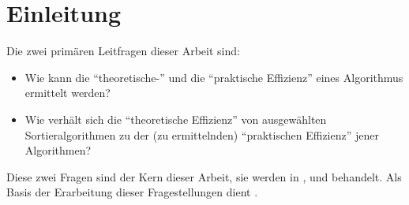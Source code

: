 \chapter*{Einleitung}


Die zwei primären Leitfragen dieser Arbeit sind:

\begin{itemize}
    \item Wie kann die \enquote{theoretische-} und die \enquote{praktische Effizienz} eines Algorithmus ermittelt werden?
    \item Wie verhält sich die \enquote{theoretische Effizienz} von ausgewählten Sortieralgorithmen zu der (zu ermittelnden) \enquote{praktischen Effizienz} jener Algorithmen?
\end{itemize}

Diese zwei Fragen sind der Kern dieser Arbeit, sie werden in ,  und  behandelt. Als Basis der Erarbeitung dieser Fragestellungen dient .

